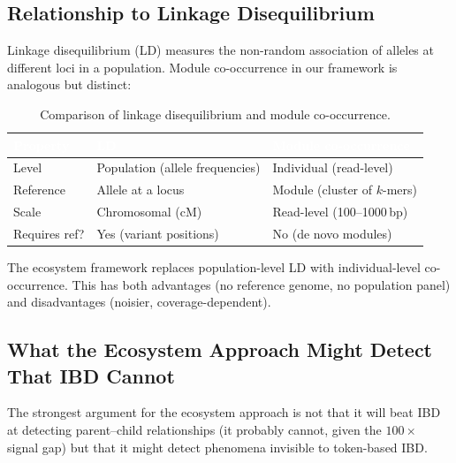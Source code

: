 \documentclass{../yalumba}
\begin{document}
\subsection{Relationship to Linkage Disequilibrium}
\label{sec:classical:ld}

Linkage disequilibrium (LD) measures the non-random association of
alleles at different loci in a population.  Module co-occurrence in our
framework is analogous but distinct:

\begin{table}[H]
  \centering
  \tablestyle
  \caption{Comparison of linkage disequilibrium and module co-occurrence.}
  \label{tab:ld_comparison}
  \begin{tabular}{lll}
    \toprule
    \rowcolor{table-header}
    \textcolor{white}{\textbf{Property}} &
    \textcolor{white}{\textbf{LD}} &
    \textcolor{white}{\textbf{Module co-occurrence}} \\
    \midrule
    Level & Population (allele frequencies) & Individual (read-level) \\
    Reference & Allele at a locus & Module (cluster of $k$-mers) \\
    Scale & Chromosomal (cM) & Read-level (100--1000\,bp) \\
    Requires ref? & Yes (variant positions) & No (de novo modules) \\
    \bottomrule
  \end{tabular}
\end{table}

The ecosystem framework replaces population-level LD with
individual-level co-occurrence.  This has both advantages (no reference
genome, no population panel) and disadvantages (noisier, coverage-dependent).

\subsection{What the Ecosystem Approach Might Detect That IBD Cannot}
\label{sec:classical:beyond}

The strongest argument for the ecosystem approach is not that it will
beat IBD at detecting parent--child relationships (it probably cannot,
given the $100\times$ signal gap) but that it might detect phenomena
invisible to token-based IBD.
\end{document}
